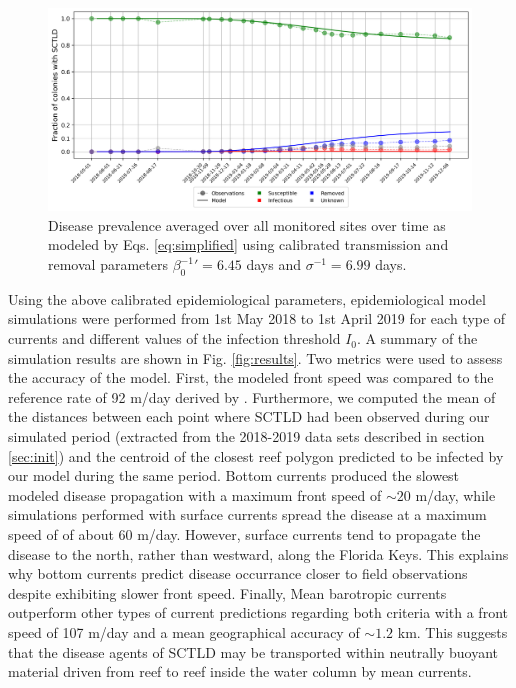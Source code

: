 \documentclass[utf8]{frontiersSCNS}
\begin{document}
\begin{figure}
    \centering
    \includegraphics[width=.95\textwidth]{figures/sir_obs.png}
    \caption{Disease prevalence averaged over all monitored sites over time as modeled by Eqs. \ref{eq:simplified} using calibrated transmission and removal parameters $\beta_0^{-1}'=6.45$ days and $\sigma^{-1}=6.99$ days.}
    \label{fig:calibration}
\end{figure}

Using the above calibrated epidemiological parameters, epidemiological model simulations were performed from 1st May 2018 to 1st April 2019 for each type of currents and different values of the infection threshold $I_0$. A summary of the simulation results are shown in Fig. \ref{fig:results}. Two metrics were used to assess the accuracy of the model. First, the modeled front speed was compared to the reference rate of 92 m/day derived by \cite{muller2020spatial}. Furthermore, we computed the mean of the distances between each point where SCTLD had been observed during our simulated period (extracted from the 2018-2019 data sets described in section \ref{sec:init}) and the centroid of the closest reef polygon predicted to be infected by our model during the same period.
Bottom currents produced the slowest modeled disease propagation with a maximum front speed of $\sim 20$ m/day, while simulations performed with surface currents spread the disease at a maximum speed of of about 60 m/day. However, surface currents tend to propagate the disease to the north, rather than westward, along the Florida Keys. This explains why bottom currents predict disease occurrance closer to field observations despite exhibiting slower front speed. Finally, Mean barotropic currents outperform other types of current predictions regarding both criteria with a front speed of 107 m/day and a mean geographical accuracy of $\sim1.2$ km. This suggests that the disease agents of SCTLD may be transported within neutrally buoyant material driven from reef to reef inside the water column by mean currents.
\end{document}
